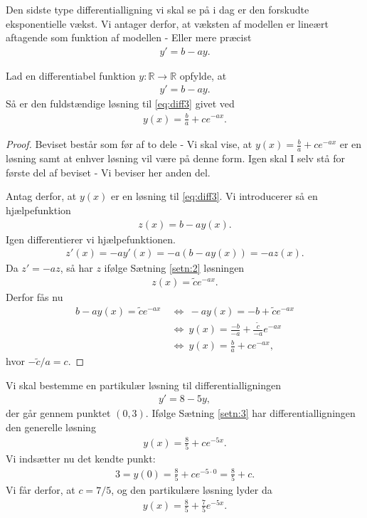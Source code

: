 Den sidste type differentialligning vi skal se på i dag er den forskudte eksponentielle vækst. Vi antager derfor, at væksten af modellen er lineært aftagende som funktion af modellen - Eller mere præcist
\begin{align*}
y' = b-ay.
\end{align*}
\begin{setn}\label{setn:3}
	Lad en differentiabel funktion $y: \mathbb{R} \to \mathbb{R}$ opfylde, at 
	\begin{align}\label{eq:diff3}
		y' = b-ay.
	\end{align}
	Så er den fuldstændige løsning til \eqref{eq:diff3} givet ved
	\begin{align*}
		y(x) = \frac{b}{a} +ce^{-ax}. 
	\end{align*}
\end{setn}
\begin{proof}
	Beviset består som før af to dele - Vi skal vise, at $y(x) = \frac{b}{a} +ce^{-ax}$ er en løsning samt at enhver løsning vil være på denne form. Igen skal I selv stå for
	første del af beviset - Vi beviser her anden del.
	
	Antag derfor, at $y(x)$ er en løsning til \eqref{eq:diff3}. Vi introducerer så en hjælpefunktion
	\begin{align*}
		z(x) = b-ay(x). 
	\end{align*}
	Igen differentierer vi hjælpefunktionen. 
	\begin{align*}
		z'(x) = -ay'(x) = -a(b-ay(x)) =-az(x). 
	\end{align*}
	Da $z' = -az$, så har $z$ ifølge Sætning \ref{setn:2} løsningen
	\begin{align*}
		z(x) = \tilde{c}e^{-ax}. 
	\end{align*}
	Derfor fås nu
	\begin{align*}
		b-ay(x) = \tilde{c}e^{-ax} \ &\Leftrightarrow \ -ay(x) = -b+\tilde{c}e^{-ax}\\
		&\Leftrightarrow	\ y(x) = \frac{-b}{-a} + \frac{\tilde{c}}{-a}e^{-ax}\\
		&\Leftrightarrow \ y(x) = \frac{b}{a} + ce^{-ax},
	\end{align*}
	hvor $-\tilde{c}/a = c$. 
\end{proof}

\begin{exa}
	Vi skal bestemme en partikulær løsning til differentialligningen	
	\begin{align*}
		y' = 8-5y,
	\end{align*}
	der går gennem punktet $(0,3)$. Ifølge Sætning \ref{setn:3} har differentialligningen den generelle løsning
	\begin{align*}
		y(x) = \frac{8}{5} + ce^{-5x}.
	\end{align*}
	Vi indsætter nu det kendte punkt:
	\begin{align*}
		3=y(0) = \frac{8}{5} + ce^{-5\cdot 0} = \frac{8}{5}+ c. 
	\end{align*}
	Vi får derfor, at $c = 7/5$, og den partikulære løsning lyder da
	\begin{align*}
		y(x) = \frac{8}{5} + \frac{7}{5}e^{-5x}.
	\end{align*}
\end{exa}

